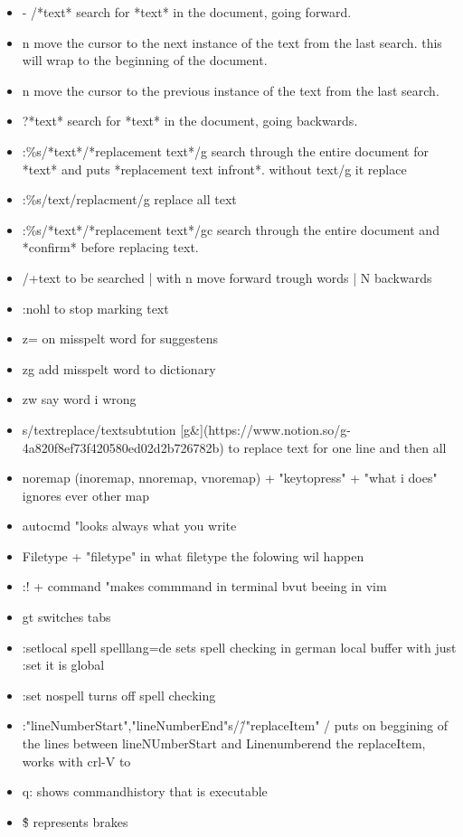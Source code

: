 \documentclass[12pt]{article}
\begin{document}
\begin{itemize}
    \item - /*text* search for *text* in the document, going forward.
    \item n move the cursor to the next instance of the text from the last search. this will wrap to the beginning of the document.
    \item n move the cursor to the previous instance of the text from the last search.
    \item ?*text* search for *text* in the document, going backwards.
    \item :\%s/*text*/*replacement text*/g search through the entire document for *text* and puts  *replacement text infront*. without text/g it replace
    \item :\%s/text/replacment/g replace all text
    \item :\%s/*text*/*replacement text*/gc search through the entire document and *confirm* before replacing text.
    \item /+text to be searched | with n move forward trough words | N backwards
    \item :nohl to stop marking text
    \item z= on misspelt word for suggestens
    \item zg add misspelt word to dictionary
    \item zw say word i wrong  
    \item s/textreplace/textsubtution [g\&](https://www.notion.so/g-4a820f8ef73f420580ed02d2b726782b) to replace text for one line and then all
    \item noremap (inoremap, nnoremap, vnoremap) + "keytopress" + "what i does"  ignores ever other map 
    \item autocmd "looks always what you write
    \item Filetype + "filetype"  in what filetype the folowing wil happen
    \item :! + command "makes commmand in terminal bvut beeing in vim
    \item gt switches tabs
    \item :setlocal spell spelllang=de sets spell checking in german local buffer with just :set it is global
    \item :set nospell turns off spell checking
    \item :"lineNumberStart","lineNumberEnd"s/\^/"replaceItem" /  puts on beggining of the lines between lineNUmberStart and Linenumberend the replaceItem, works with crl-V to
    \item q: shows commandhistory that is executable
    \item \^\$ represents brakes


\end{itemize}
\end{document}
